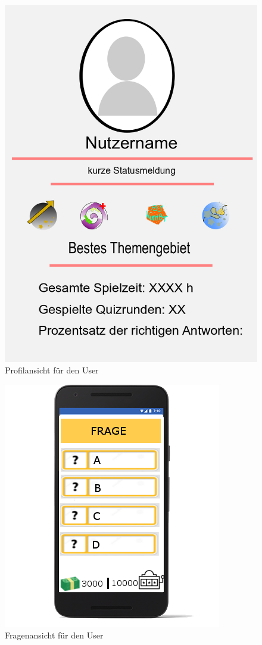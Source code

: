 \documentclass[11pt,a4paper]{scrreprt}
\begin{document}
\begin{figure}
	\centering
	\includegraphics[height = 0.4\textheight]{Profil.png}
	\caption{Profilansicht für den User}
	\label{img:Profil}
\end{figure}

\begin{figure}
	\centering
	\includegraphics[height = 0.4\textheight]{version_2.png}
	\caption{Fragenansicht für den User}
	\label{img:Frage}
\end{figure}
\end{document}
